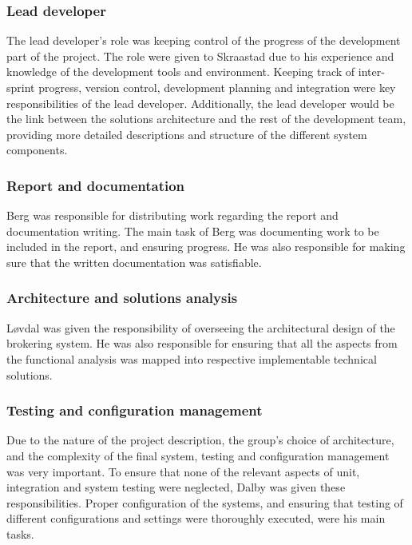 \subsubsection{Lead developer}

The lead developer's role was keeping control of the progress of the development part of the project. The role were given to Skraastad due to his experience and knowledge of the development tools and environment. Keeping track of inter-sprint progress, version control, development planning and integration were key responsibilities of the lead developer. Additionally, the lead developer would be the link between the solutions architecture and the rest of the development team, providing more detailed descriptions and structure of the different system components.

\subsubsection{Report and documentation}

Berg was responsible for distributing work regarding the report and documentation writing. The main task of Berg was documenting work to be included in the report, and ensuring progress. He was also responsible for making sure that the written documentation was satisfiable.

\subsubsection{Architecture and solutions analysis}

Løvdal was given the responsibility of overseeing the architectural design of the brokering system. He was also responsible for ensuring that all the aspects from the functional analysis was mapped into respective implementable technical solutions.

\subsubsection{Testing and configuration management}

Due to the nature of the project description, the group's choice of architecture, and the complexity of the final system, testing and configuration management was very important. To ensure that none of the relevant aspects of unit, integration and system testing were neglected, Dalby was given these responsibilities. Proper configuration of the systems, and ensuring that testing of different configurations and settings were thoroughly executed, were his main tasks.

